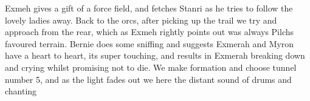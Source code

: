 Exmeh gives a gift of a force field, and fetches Stanri as he tries to follow the lovely ladies away.\medskip
Back to the orcs, after picking up the trail we try and approach from the rear, which as Exmeh rightly points out was always Pilchs favoured terrain. Bernie does some sniffing and suggests\medskip
Exmerah and Myron have a heart to heart, its super touching, and results in Exmerah breaking down and crying whilst promising not to die.\medskip
We make formation and choose tunnel number 5, and as the light fades out we here the distant sound of drums and chanting\medskip
